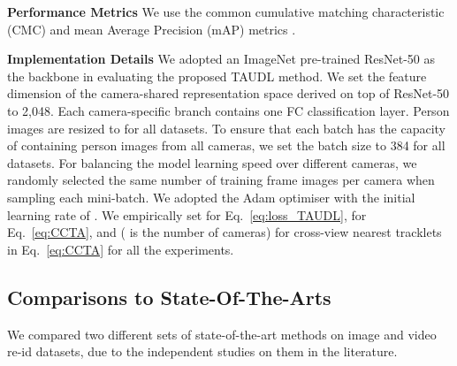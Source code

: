 \documentclass[runningheads]{llncs}
\begin{document}
\noindent \textbf{Performance Metrics } 
We use the common cumulative matching characteristic (CMC) and mean Average Precision (mAP) metrics \cite{zheng2015scalable}.

\noindent \textbf{Implementation Details }
We adopted an ImageNet pre-trained ResNet-50 \cite{he2016deep} as the backbone
in evaluating the proposed TAUDL method.
We set the feature dimension of the camera-shared representation space derived on top of ResNet-50
to 2,048.
Each camera-specific branch contains one FC classification layer.
Person images are resized to  for all datasets.
To ensure that each batch has the capacity of containing person images from all cameras, 
we set the batch size to 384 for all datasets.
For balancing the model learning speed over different cameras,
we randomly selected the same number of training frame images
per camera when sampling each mini-batch. 
We adopted the Adam optimiser \cite{kingma2014adam} with the initial learning rate of . 
We empirically set  for Eq.~\eqref{eq:loss_TAUDL},
 for Eq.~\eqref{eq:CCTA}, and  ( is the number of cameras) for cross-view nearest tracklets  in Eq.~\eqref{eq:CCTA} for all the experiments.


\subsection{Comparisons to State-Of-The-Arts}

We compared two different sets of state-of-the-art methods
on image and video re-id datasets, due to the independent studies on them 
in the literature.
\end{document}

